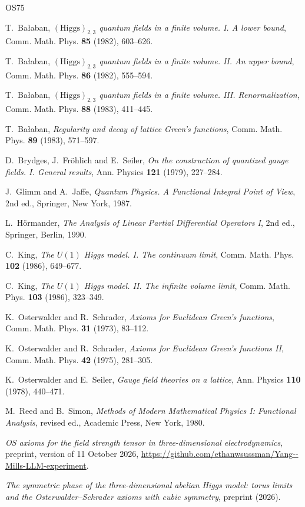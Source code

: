 \documentclass[11pt]{amsart}
\theoremstyle{plain}
\theoremstyle{definition}
\theoremstyle{remark}
\numberwithin{equation}{section}
\begin{document}
\begin{thebibliography}{OS75}

T.~Ba{\l}aban, \emph{$(\mathrm{Higgs})_{2,3}$ quantum fields in a finite volume. I. A lower bound}, Comm. Math. Phys. \textbf{85} (1982), 603--626.

T.~Ba{\l}aban, \emph{$(\mathrm{Higgs})_{2,3}$ quantum fields in a finite volume. II. An upper bound}, Comm. Math. Phys. \textbf{86} (1982), 555--594.

T.~Ba{\l}aban, \emph{$(\mathrm{Higgs})_{2,3}$ quantum fields in a finite volume. III. Renormalization}, Comm. Math. Phys. \textbf{88} (1983), 411--445.

T.~Ba{\l}aban, \emph{Regularity and decay of lattice Green's functions}, Comm. Math. Phys. \textbf{89} (1983), 571--597.

D.~Brydges, J.~Fr\"ohlich and E.~Seiler, \emph{On the construction of quantized gauge fields. I. General results}, Ann. Physics \textbf{121} (1979), 227--284.

J.~Glimm and A.~Jaffe, \emph{Quantum Physics. A Functional Integral Point of View}, 2nd ed., Springer, New York, 1987.

L.~H\"ormander, \emph{The Analysis of Linear Partial Differential Operators I}, 2nd ed., Springer, Berlin, 1990.

C.~King, \emph{The $U(1)$ Higgs model. I. The continuum limit}, Comm. Math. Phys. \textbf{102} (1986), 649--677.

C.~King, \emph{The $U(1)$ Higgs model. II. The infinite volume limit}, Comm. Math. Phys. \textbf{103} (1986), 323--349.

K.~Osterwalder and R.~Schrader, \emph{Axioms for Euclidean Green's functions}, Comm. Math. Phys. \textbf{31} (1973), 83--112.

K.~Osterwalder and R.~Schrader, \emph{Axioms for Euclidean Green's functions II}, Comm. Math. Phys. \textbf{42} (1975), 281--305.

K.~Osterwalder and E.~Seiler, \emph{Gauge field theories on a lattice}, Ann. Physics \textbf{110} (1978), 440--471.

M.~Reed and B.~Simon, \emph{Methods of Modern Mathematical Physics I: Functional Analysis}, revised ed., Academic Press, New York, 1980.

\emph{OS axioms for the field strength tensor in three-dimensional electrodynamics}, preprint, version of 11 October 2026, \url{https://github.com/ethanwsussman/Yang--Mills-LLM-experiment}.

\emph{The symmetric phase of the three-dimensional abelian Higgs model: torus limits and the Osterwalder--Schrader axioms with cubic symmetry}, preprint (2026).

\end{thebibliography}
\end{document}

